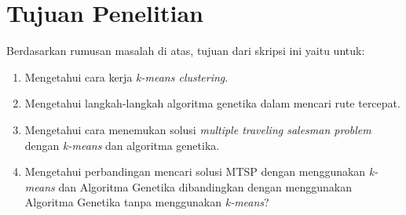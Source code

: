 \section{Tujuan Penelitian}

Berdasarkan rumusan masalah di atas, tujuan dari skripsi ini yaitu untuk:
\begin{enumerate}
	\item Mengetahui cara kerja \textit{k-means clustering}.
	\item Mengetahui langkah-langkah algoritma genetika dalam mencari rute tercepat.
	\item Mengetahui cara menemukan solusi \textit{multiple traveling salesman problem} dengan \textit{k-means} dan algoritma genetika.
	\item Mengetahui perbandingan mencari solusi MTSP dengan menggunakan \textit{k-means} dan Algoritma Genetika dibandingkan dengan menggunakan Algoritma Genetika tanpa menggunakan \textit{k-means}?
\end{enumerate}
